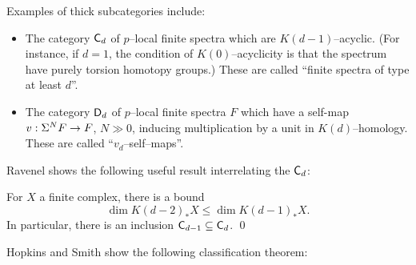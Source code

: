 \noindent Examples of thick subcategories include:
\begin{itemize}
\item The category $\mathsf{C}_d$ of $p$--local finite spectra which are $K(d-1)$--acyclic.  (For instance, if $d = 1$, the condition of $K(0)$--acyclicity is that the spectrum have purely torsion homotopy groups.)  These are called ``finite spectra of type at least $d$''.
\item The category $\mathsf{D}_d$ of $p$--local finite spectra $F$ which have a self-map $v: \Sigma^N F \to F$, $N \gg 0$, inducing multiplication by a unit in $K(d)$--homology.  These are called ``$v_d$--self--maps''.
\end{itemize}

Ravenel shows the following useful result interrelating the $\mathsf{C}_d$:
\begin{lemma}\label{CdCategoriesNest}
For $X$ a finite complex, there is a bound \[\dim K(d-2)_* X \le \dim K(d-1)_* X.\]  In particular, there is an inclusion $\mathsf{C}_{d-1} \subseteq \mathsf{C}_d$. \qed
\end{lemma}

Hopkins and Smith show the following classification theorem:

